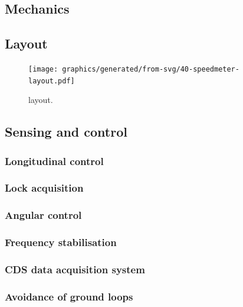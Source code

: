 \subsection{Mechanics}

\subsection{Layout}

\begin{figure}
  \centering
  \texttt{[image: graphics/generated/from-svg/40-speedmeter-layout.pdf]}
  \caption[\SSMEXPT{} layout]{\label{fig:ssm-layout}\SSMEXPT{} layout.}
\end{figure}

\subsection{Sensing and control}

\subsubsection{Longitudinal control}

\subsubsection{Lock acquisition}

\subsubsection{Angular control}

\subsubsection{Frequency stabilisation}

\subsubsection{\label{sec:cds}CDS data acquisition system}


\subsubsection{Avoidance of ground loops}

